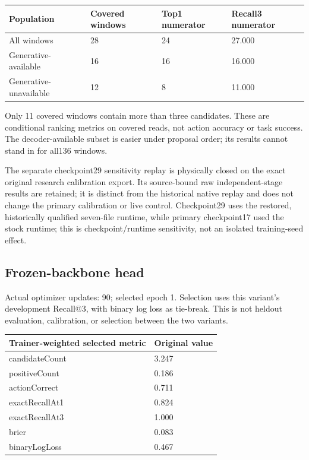 \documentclass[10pt]{article}
\begin{document}
\begin{longtable}[]{@{}llll@{}}
\toprule\noalign{}
Population & Covered windows & Top1 numerator & Recall3 numerator \\
\midrule\noalign{}
\endhead
\bottomrule\noalign{}
\endlastfoot
All windows & 28 & 24 & 27.000 \\
Generative-available & 16 & 16 & 16.000 \\
Generative-unavailable & 12 & 8 & 11.000 \\
\end{longtable}

Only 11 covered windows contain more than three candidates. These are conditional ranking metrics on covered reads, not action accuracy or task success. The decoder-available subset is easier under proposal order; its results cannot stand in for all136 windows.

The separate checkpoint29 sensitivity replay is physically closed on the exact original research calibration export. Its source-bound raw independent-stage results are retained; it is distinct from the historical native replay and does not change the primary calibration or live control. Checkpoint29 uses the restored, historically qualified seven-file runtime, while primary checkpoint17 used the stock runtime; this is checkpoint/runtime sensitivity, not an isolated training-seed effect.

\hypertarget{frozen-backbone-head}{%
\subsection{Frozen-backbone head}\label{frozen-backbone-head}}

Actual optimizer updates: 90; selected epoch 1. Selection uses this variant's development Recall@3, with binary log loss as tie-break. This is not heldout evaluation, calibration, or selection between the two variants.

\begin{longtable}[]{@{}ll@{}}
\toprule\noalign{}
Trainer-weighted selected metric & Original value \\
\midrule\noalign{}
\endhead
\bottomrule\noalign{}
\endlastfoot
candidateCount & 3.247 \\
positiveCount & 0.186 \\
actionCorrect & 0.711 \\
exactRecallAt1 & 0.824 \\
exactRecallAt3 & 1.000 \\
brier & 0.083 \\
binaryLogLoss & 0.467 \\
\end{longtable}
\end{document}
